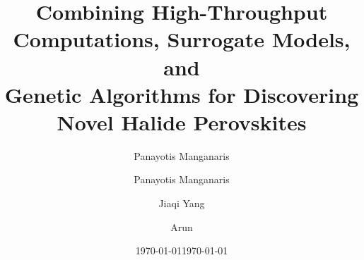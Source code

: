 \documentclass[aip, jmp, amsmath, amssymb]{revtex4-2}
\author{Panayotis Manganaris}
\date{\today}
\title{}
\begin{document}
\title{%
Combining High-Throughput Computations, Surrogate Models, and\\
Genetic Algorithms for Discovering Novel Halide Perovskites
}

\author{Panayotis Manganaris}
\author{Jiaqi Yang}
\author{Arun }

\date{\today}
\maketitle
\end{document}
